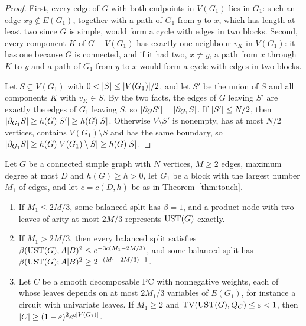 \begin{proof}
First, every edge of $G$ with both endpoints in $V(G_1)$ lies in $G_1$: such an edge $xy\notin E(G_1)$, together with a path of $G_1$ from $y$ to $x$, which has length at least two since $G$ is simple, would form a cycle with edges in two blocks. Second, every component $K$ of $G-V(G_1)$ has exactly one neighbour $v_K$ in $V(G_1)$: it has one because $G$ is connected, and if it had two, $x\ne y$, a path from $x$ through $K$ to $y$ and a path of $G_1$ from $y$ to $x$ would form a cycle with edges in two blocks.

Let $S\subseteq V(G_1)$ with $0<\lvert S\rvert\le\lvert V(G_1)\rvert/2$, and let $S'$ be the union of $S$ and all components $K$ with $v_K\in S$. By the two facts, the edges of $G$ leaving $S'$ are exactly the edges of $G_1$ leaving $S$, so $\lvert \partial_GS'\rvert=\lvert \partial_{G_1}S\rvert$. If $\lvert S'\rvert\le N/2$, then $\lvert \partial_{G_1}S\rvert\ge h(G)\lvert S'\rvert\ge h(G)\lvert S\rvert$. Otherwise $V\setminus S'$ is nonempty, has at most $N/2$ vertices, contains $V(G_1)\setminus S$ and has the same boundary, so $\lvert \partial_{G_1}S\rvert\ge h(G)\lvert V(G_1)\setminus S\rvert\ge h(G)\lvert S\rvert$.
\end{proof}

\begin{theorem}\label{thm:blocks}
Let $G$ be a connected simple graph with $N$ vertices, $M\ge2$ edges, maximum degree at most $D$ and $h(G)\ge h>0$, let $G_1$ be a block with the largest number $M_1$ of edges, and let $c=c(D,h)$ be as in Theorem~\ref{thm:touch}.
\begin{enumerate}[label=(\alph*)]
\item If $M_1\le2M/3$, some balanced split has $\beta=1$, and a product node with two leaves of arity at most $2M/3$ represents $\mathrm{UST}(G)$ exactly.
\item If $M_1>2M/3$, then every balanced split satisfies $\beta(\mathrm{UST}(G);A|B)^2\le e^{-3c(M_1-2M/3)}$, and some balanced split has $\beta(\mathrm{UST}(G);A|B)^2\ge2^{-(M_1-2M/3)-1}$.
\item Let $C$ be a smooth decomposable PC with nonnegative weights, each of whose leaves depends on at most $2M_1/3$ variables of $E(G_1)$, for instance a circuit with univariate leaves. If $M_1\ge2$ and $\mathrm{TV}(\mathrm{UST}(G),Q_C)\le\varepsilon<1$, then $\lvert C\rvert\ge(1-\varepsilon)^2e^{c\lvert V(G_1)\rvert}$.
\end{enumerate}
\end{theorem}

